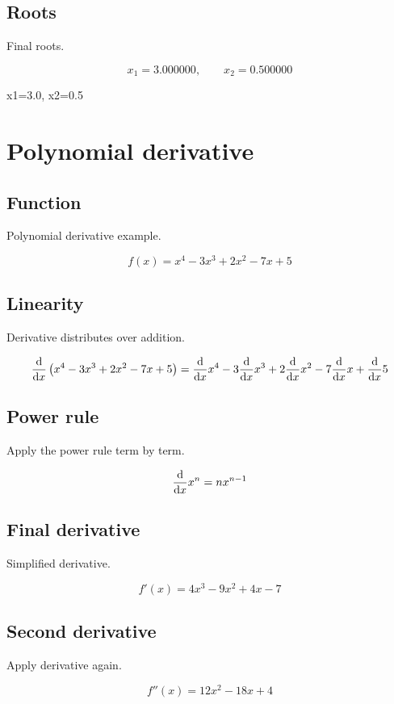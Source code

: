 \documentclass[11pt,a4paper]{article}
\begin{document}
\subsection{Roots}
Final roots.
\begin{derivationbox}
\[
x_1=3.000000,\qquad x_2=0.500000
\]
\end{derivationbox}

\begin{resultbox} x1=3.0, x2=0.5 \end{resultbox}

\section{Polynomial derivative}

\subsection{Function}
Polynomial derivative example.
\begin{derivationbox}
\[
f(x)=x^4-3x^3+2x^2-7x+5
\]
\end{derivationbox}

\subsection{Linearity}
Derivative distributes over addition.
\begin{derivationbox}
\[
\dv{x}\left(x^4-3x^3+2x^2-7x+5\right)=\dv{x}x^4-3\dv{x}x^3+2\dv{x}x^2-7\dv{x}x+\dv{x}5
\]
\end{derivationbox}

\subsection{Power rule}
Apply the power rule term by term.
\begin{derivationbox}
\[
\dv{x}x^n=nx^{n-1}
\]
\end{derivationbox}

\subsection{Final derivative}
Simplified derivative.
\begin{derivationbox}
\[
f'(x)=4x^3-9x^2+4x-7
\]
\end{derivationbox}

\subsection{Second derivative}
Apply derivative again.
\begin{derivationbox}
\[
f''(x)=12x^2-18x+4
\]
\end{derivationbox}
\end{document}
